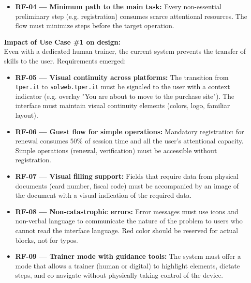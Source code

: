 ﻿\documentclass[11pt,a4paper]{article}
\begin{document}
\begin{center}
\begin{tcolorbox}[base]
{\begin{itemize}[leftmargin=*]
        \item \textbf{RF-04 --- Minimum path to the main task:}
        Every non-essential preliminary step (e.g. registration) consumes scarce attentional resources. The flow must minimize steps before the target operation.
    \end{itemize}
    }
\end{tcolorbox}

\vspace{0.3cm}

\begin{tcolorbox}[base]
    {\small
    \textbf{Impact of Use Case \#1 on design:} \\[4pt]
    Even with a dedicated human trainer, the current system prevents the transfer of skills to the user. Requirements emerged:

    \begin{itemize}[leftmargin=*]
        \item \textbf{RF-05 --- Visual continuity across platforms:}
        The transition from \texttt{tper.it} to \texttt{solweb.tper.it} must be signaled to the user with a context indicator (e.g. overlay "You are about to move to the purchase site"). The interface must maintain visual continuity elements (colors, logo, familiar layout).

        \item \textbf{RF-06 --- Guest flow for simple operations:}
        Mandatory registration for renewal consumes 50\% of session time and all the user's attentional capacity. Simple operations (renewal, verification) must be accessible without registration.

        \item \textbf{RF-07 --- Visual filling support:}
        Fields that require data from physical documents (card number, fiscal code) must be accompanied by an image of the document with a visual indication of the required data.

        \item \textbf{RF-08 --- Non-catastrophic errors:}
        Error messages must use icons and non-verbal language to communicate the nature of the problem to users who cannot read the interface language. Red color should be reserved for actual blocks, not for typos.

        \item \textbf{RF-09 --- Trainer mode with guidance tools:}
        The system must offer a mode that allows a trainer (human or digital) to highlight elements, dictate steps, and co-navigate without physically taking control of the device.
    \end{itemize}
    }
\end{tcolorbox}

\vspace{0.3cm}

\end{center}
\end{document}
